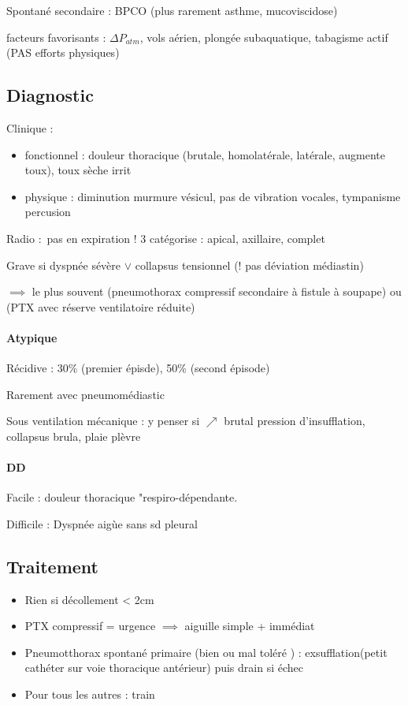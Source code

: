 \documentclass{article}
\begin{document}
Spontané secondaire : BPCO (plus rarement asthme, mucoviscidose)

facteurs favorisants : $\Delta P_{atm}$, vols aérien, plongée subaquatique,
tabagisme actif (PAS
efforts physiques)

\subsection{Diagnostic}
Clinique : 
\begin{itemize}
\item fonctionnel : douleur thoracique (brutale, homolatérale, latérale,
  augmente toux), toux sèche irrit
\item physique : diminution murmure vésicul, pas de vibration vocales,
  tympanisme percusion
\end{itemize}
Radio : pas en expiration ! 3 catégorise : apical, axillaire, complet

Grave si dyspnée sévère $\vee$ collapsus tensionnel (! pas déviation médiastin) 

$\implies$ le plus souvent (pneumothorax compressif secondaire à fistule à
soupape) ou (PTX avec réserve ventilatoire réduite)

\paragraph{Atypique}
Récidive : 30\% (premier épisde), 50\% (second épisode)

Rarement avec pneumomédiastic

Sous ventilation mécanique : y penser si $\nearrow$ brutal pression
d'insufflation, collapsus brula, plaie plèvre

\paragraph{DD}
Facile : douleur thoracique "respiro-dépendante.

Difficile : Dyspnée aigùe sans sd pleural 

\subsection{Traitement}
\begin{itemize}
\item Rien si décollement < 2cm
\item PTX compressif = urgence $\implies$ aiguille simple + immédiat
\item Pneumotthorax spontané primaire (bien ou mal toléré ) :
  exsufflation(petit cathéter sur voie thoracique antérieur) puis drain
  si échec
\item Pour tous les autres : train
\end{itemize}
\end{document}
